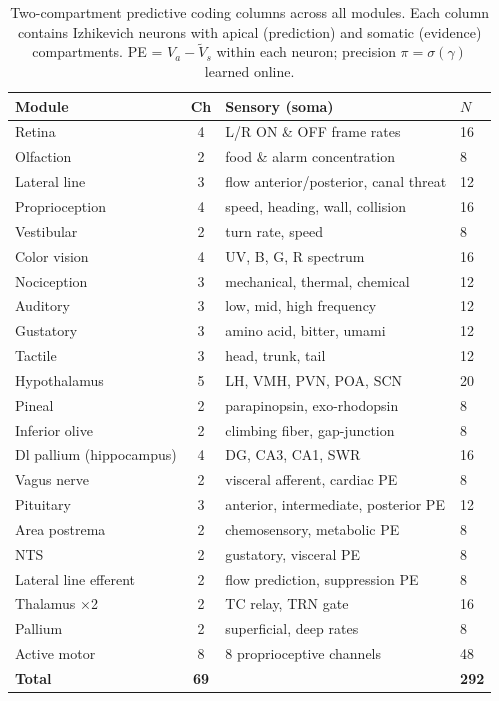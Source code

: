 \documentclass[12pt]{article}
\begin{document}
\begin{table}[t]
\centering
\caption{Two-compartment predictive coding columns across all modules.
Each column contains Izhikevich neurons with apical (prediction) and
somatic (evidence) compartments.  PE = $V_a - \tilde{V}_s$ within each
neuron; precision $\pi = \sigma(\gamma)$ learned online.}
\label{tab:two_comp}
\small
\begin{tabular}{lcll}
\toprule
Module & Ch & Sensory (soma) & $N$ \\
\midrule
Retina      & 4 & L/R ON \& OFF frame rates  & 16 \\
Olfaction   & 2 & food \& alarm concentration & 8  \\
Lateral line& 3 & flow anterior/posterior, canal threat & 12 \\
Proprioception& 4 & speed, heading, wall, collision   & 16 \\
Vestibular  & 2 & turn rate, speed           & 8  \\
Color vision& 4 & UV, B, G, R spectrum       & 16 \\
Nociception & 3 & mechanical, thermal, chemical & 12 \\
Auditory    & 3 & low, mid, high frequency   & 12 \\
Gustatory   & 3 & amino acid, bitter, umami   & 12 \\
Tactile     & 3 & head, trunk, tail           & 12 \\
Hypothalamus & 5 & LH, VMH, PVN, POA, SCN     & 20 \\
Pineal       & 2 & parapinopsin, exo-rhodopsin & 8  \\
Inferior olive & 2 & climbing fiber, gap-junction & 8 \\
Dl pallium (hippocampus) & 4 & DG, CA3, CA1, SWR & 16 \\
Vagus nerve & 2 & visceral afferent, cardiac PE & 8 \\
Pituitary   & 3 & anterior, intermediate, posterior PE & 12 \\
Area postrema & 2 & chemosensory, metabolic PE & 8 \\
NTS         & 2 & gustatory, visceral PE     & 8 \\
Lateral line efferent & 2 & flow prediction, suppression PE & 8 \\
Thalamus $\times$2& 2 & TC relay, TRN gate  & 16 \\
Pallium     & 2 & superficial, deep rates    & 8  \\
Active motor& 8 & 8 proprioceptive channels  & 48 \\
\midrule
\textbf{Total} & \textbf{69} & & \textbf{292} \\
\bottomrule
\end{tabular}
\end{table}
\end{document}
